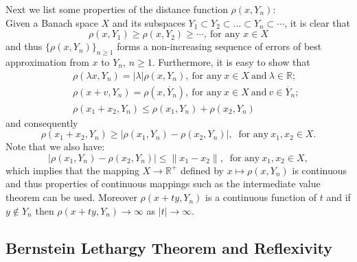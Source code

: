 \documentclass[12pt, reqno]{amsart}
\theoremstyle{definition}
\theoremstyle{remark}
\numberwithin{equation}{section}
\begin{document}
 Next we list some properties of the distance function $\rho(x, Y_n)$:\\[.02in]
Given a Banach space $X$ and its subspaces $Y_1\subset Y_2 \subset \dots \subset Y_n\subset \cdots$, it is clear that $$ \rho(x, Y_1) \geq\rho(x,Y_2)\geq \cdots, ~\mbox{for any $x\in X$}$$ and  thus $\{\rho(x,Y_n)\}_{n\ge1}$ forms a non-increasing sequence of errors of best approximation from $x$ to $Y_n$, $n\ge1$.  Furthermore,  it is easy to show that
\begin{eqnarray*}
&&\rho(\lambda x, Y_n)= |\lambda| \rho(x, Y_n),~\mbox{for any}~ x\in X~\mbox{and}~\lambda\in\mathbb R;\\
&& \rho(x+v, Y_n)= \rho(x, \overline Y_n),~\mbox{for any}~x\in X~ \mbox{and}~v\in \overline Y_n;\\
&&\rho(x_1+x_2, Y_n)\leq \rho(x_1, Y_n)+\rho(x_2, Y_n)
\end{eqnarray*}
and consequently   $$\rho(x_1+x_2, Y_n)\geq |\rho(x_1, Y_n)-\rho(x_2, Y_n)|,~ \mbox{ for any}~  x_1,x_2\in X.$$
 Note that we also have: $$ |\rho(x_1, Y_n)-\rho(x_2, Y_n)| \leq \|x_1-x_2\|,~ \mbox{ for any}~  x_1,x_2 \in X,$$ which  implies that  the mapping $X \longrightarrow \mathbb{R}^+$  defined by $ x\longmapsto \rho(x, Y_n)$ is  continuous and thus properties of continuous mappings such as the intermediate value theorem can be used. Moreover 
 $ \rho(x+ty, Y_n)$ is a continuous function of $t$ and
 if $y \notin Y_n$ then $ \rho(x+ty, Y_n) \to \infty$ as $|t| \to \infty$.

\subsection{Bernstein Lethargy Theorem and Reflexivity}
\end{document}
